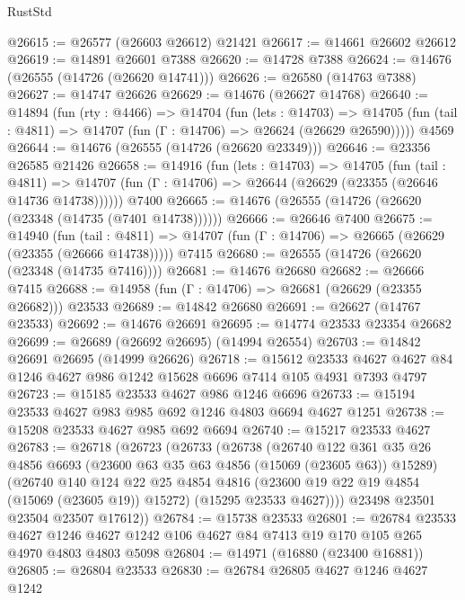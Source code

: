 \begin{lexlean}{RustStd}
\begin{coremodule}
@26615 := @26577 (@26603 @26612) @21421
@26617 := @14661 @26602 @26612
@26619 := @14891 @26601 @7388
@26620 := @14728 @7388
@26624 := @14676 (@26555 (@14726 (@26620 @14741)))
@26626 := @26580 (@14763 @7388)
@26627 := @14747 @26626
@26629 := @14676 (@26627 @14768)
@26640 := @14894
    (fun (rty : @4466) =>
    @14704
      (fun (lets : @14703) =>
      @14705 (fun (tail : @4811) => @14707 (fun (Γ : @14706) => @26624 (@26629 @26590)))))
    @4569
@26644 := @14676 (@26555 (@14726 (@26620 @23349)))
@26646 := @23356 @26585 @21426
@26658 := @14916
    (fun (lets : @14703) =>
    @14705
      (fun (tail : @4811) =>
      @14707 (fun (Γ : @14706) => @26644 (@26629 (@23355 (@26646 @14736 @14738))))))
    @7400
@26665 := @14676 (@26555 (@14726 (@26620 (@23348 (@14735 (@7401 @14738))))))
@26666 := @26646 @7400
@26675 := @14940
    (fun (tail : @4811) => @14707 (fun (Γ : @14706) => @26665 (@26629 (@23355 (@26666 @14738)))))
    @7415
@26680 := @26555 (@14726 (@26620 (@23348 (@14735 @7416))))
@26681 := @14676 @26680
@26682 := @26666 @7415
@26688 := @14958 (fun (Γ : @14706) => @26681 (@26629 (@23355 @26682))) @23533
@26689 := @14842 @26680
@26691 := @26627 (@14767 @23533)
@26692 := @14676 @26691
@26695 := @14774 @23533 @23354 @26682
@26699 := @26689 (@26692 @26695) (@14994 @26554)
@26703 := @14842 @26691 @26695 (@14999 @26626)
@26718 := @15612
    @23533
    @4627
    @4627
    @84
    @1246
    @4627
    @986
    @1242
    @15628
    @6696
    @7414
    @105
    @4931
    @7393
    @4797
@26723 := @15185 @23533 @4627 @986 @1246 @6696
@26733 := @15194 @23533 @4627 @983 @985 @692 @1246 @4803 @6694 @4627 @1251
@26738 := @15208 @23533 @4627 @985 @692 @6694
@26740 := @15217 @23533 @4627
@26783 := @26718
    (@26723
      (@26733
        (@26738
          (@26740
            @122
            @361
            @35
            @26
            @4856
            @6693
            (@23600 @63 @35 @63 @4856 (@15069 (@23605 @63)) @15289)
            (@26740
              @140
              @124
              @22
              @25
              @4854
              @4816
              (@23600 @19 @22 @19 @4854 (@15069 (@23605 @19)) @15272)
              (@15295 @23533 @4627))))
        @23498
        @23501
        @23504
        @23507
        @17612))
@26784 := @15738 @23533
@26801 := @26784
    @23533
    @4627
    @1246
    @4627
    @1242
    @106
    @4627
    @84
    @7413
    @19
    @170
    @105
    @265
    @4970
    @4803
    @4803
    @5098
@26804 := @14971 (@16880 (@23400 @16881))
@26805 := @26804 @23533
@26830 := @26784
    @26805
    @4627
    @1246
    @4627
    @1242

\end{coremodule}
\end{lexlean}
